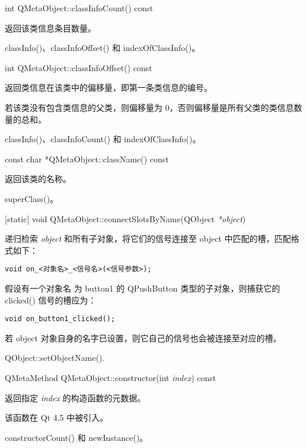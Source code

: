 int QMetaObject::classInfoCount() const

返回该类信息条目数量。

\begin{notice}[另请参阅]
classInfo()、classInfoOffset() 和 indexOfClassInfo()。
\end{notice}

int QMetaObject::classInfoOffset() const

返回类信息在该类中的偏移量，即第一条类信息的编号。

若该类没有包含类信息的父类，则偏移量为 0，否则偏移量是所有父类的类信息数量的总和。

\begin{notice}[另请参阅]
classInfo()、classInfoCount() 和 indexOfClassInfo()。
\end{notice}

const char *QMetaObject::className() const

返回该类的名称。

\begin{notice}[另请参阅]
superClass()。
\end{notice}

[static] void QMetaObject::connectSlotsByName(QObject \emph{*object})

递归检索 \emph{object} 和所有子对象，将它们的信号连接至 object 中匹配的槽，匹配格式如下：

\begin{lstlisting}
void on_<对象名>_<信号名>(<信号参数>);
\end{lstlisting}

假设有一个对象名 为 button1 的 QPushButton 类型的子对象，则捕获它的 clicked() 信号的槽应为：

\begin{lstlisting}
void on_button1_clicked();
\end{lstlisting}

若 object 对象自身的名字已设置，则它自己的信号也会被连接至对应的槽。

\begin{notice}[另请参阅]
QObject::setObjectName().
\end{notice}

QMetaMethod QMetaObject::constructor(int \emph{index}) const

返回指定 \emph{index} 的构造函数的元数据。

该函数在 Qt 4.5 中被引入。

\begin{notice}[另请参阅]
constructorCount() 和 newInstance()。
\end{notice}

